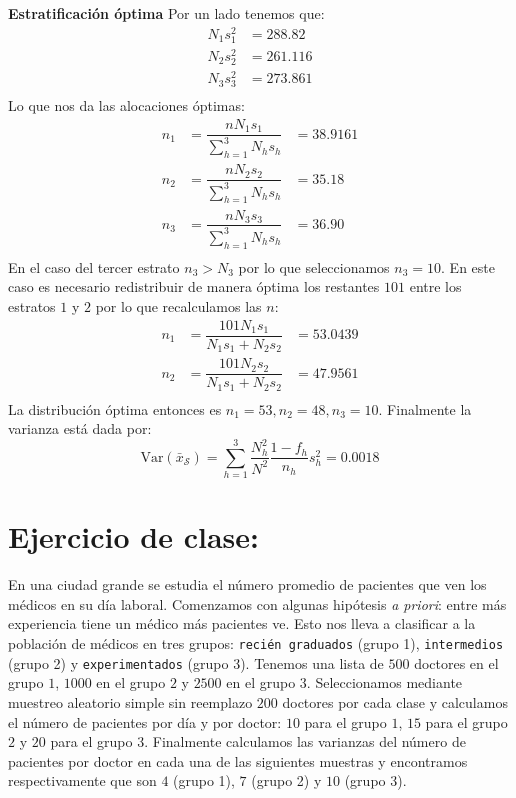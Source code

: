\documentclass[
]{book}
\begin{document}
\textbf{Estratificación óptima}
Por un lado tenemos que:
\begin{equation}\nonumber
\begin{aligned}
N_1 s^2_1 & = 288.82 \\
N_2 s^2_2 & = 261.116 \\
N_3 s^2_3 & = 273.861 \\
\end{aligned}
\end{equation}
Lo que nos da las alocaciones óptimas:
\begin{equation}\nonumber
\begin{aligned}
n_1 & = \dfrac{n N_1 s_1}{\sum_{h = 1}^3 N_h s_h} & = 38.9161 \\
n_2 & = \dfrac{n N_2 s_2}{\sum_{h = 1}^3 N_h s_h} & = 35.18 \\
n_3 & = \dfrac{n N_3 s_3}{\sum_{h = 1}^3 N_h s_h} & = 36.90 \\
\end{aligned}
\end{equation}
En el caso del tercer estrato \(n_3 > N_3\) por lo que seleccionamos \(n_3 = 10\). En este caso es necesario redistribuir de manera óptima los restantes \(101\) entre los estratos \(1\) y \(2\) por lo que recalculamos las \(n\):
\begin{equation}\nonumber
\begin{aligned}
n_1 & = \dfrac{101 N_1 s_1}{N_1 s_1 + N_2 s_2} & = 53.0439 \\ 
n_2 & = \dfrac{101 N_2 s_2}{N_1 s_1 + N_2 s_2} & = 47.9561 \\
\end{aligned}
\end{equation}
La distribución óptima entonces es \(n_1 = 53, n_2 = 48, n_3 = 10\). Finalmente la varianza está dada por:
\[
\text{Var}(\bar{x}_{\mathcal{S}}) = \sum\limits_{h = 1}^3 \dfrac{N_h^2}{N^2} \dfrac{1 - f_h}{n_h} s^2_h = 0.0018
\]

\hypertarget{ejercicio-de-clase}{%
\section{Ejercicio de clase:}\label{ejercicio-de-clase}}

En una ciudad grande se estudia el número promedio de pacientes que ven los médicos en su día laboral. Comenzamos con algunas hipótesis \emph{a priori}: entre más experiencia tiene un médico más pacientes ve. Esto nos lleva a clasificar a la población de médicos en tres grupos: \texttt{recién\ graduados} (grupo 1), \texttt{intermedios} (grupo 2) y \texttt{experimentados} (grupo 3). Tenemos una lista de \(500\) doctores en el grupo \(1\), \(1000\) en el grupo \(2\) y \(2500\) en el grupo \(3\). Seleccionamos mediante muestreo aleatorio simple sin reemplazo \(200\) doctores por cada clase y calculamos el número de pacientes por día y por doctor: \(10\) para el grupo \(1\), \(15\) para el grupo \(2\) y \(20\) para el grupo \(3\). Finalmente calculamos las varianzas del número de pacientes por doctor en cada una de las siguientes muestras y encontramos respectivamente que son \(4\) (grupo 1), \(7\) (grupo 2) y \(10\) (grupo 3).
\end{document}
